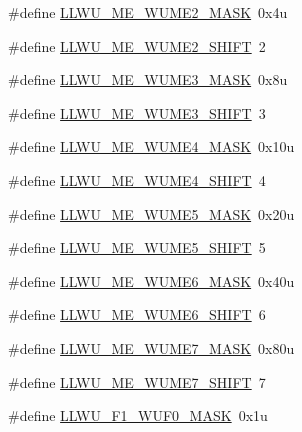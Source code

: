 \begin{DoxyCompactItemize}
\item 
\#define \hyperlink{group___l_l_w_u___register___masks_ga9f19f501dd2ad4aa2f7b01ac8edf8056}{L\+L\+W\+U\+\_\+\+M\+E\+\_\+\+W\+U\+M\+E2\+\_\+\+M\+A\+SK}~0x4u
\item 
\#define \hyperlink{group___l_l_w_u___register___masks_ga383c567df0dbc9edf2773d29676a7b30}{L\+L\+W\+U\+\_\+\+M\+E\+\_\+\+W\+U\+M\+E2\+\_\+\+S\+H\+I\+FT}~2
\item 
\#define \hyperlink{group___l_l_w_u___register___masks_ga6f6ea286130568de4df073a50fbdc282}{L\+L\+W\+U\+\_\+\+M\+E\+\_\+\+W\+U\+M\+E3\+\_\+\+M\+A\+SK}~0x8u
\item 
\#define \hyperlink{group___l_l_w_u___register___masks_ga394f6049d44881fafbc58b62e3ea8f44}{L\+L\+W\+U\+\_\+\+M\+E\+\_\+\+W\+U\+M\+E3\+\_\+\+S\+H\+I\+FT}~3
\item 
\#define \hyperlink{group___l_l_w_u___register___masks_ga4b7fa4566d64069e93d5bf9bf69efcf4}{L\+L\+W\+U\+\_\+\+M\+E\+\_\+\+W\+U\+M\+E4\+\_\+\+M\+A\+SK}~0x10u
\item 
\#define \hyperlink{group___l_l_w_u___register___masks_gad162d87bd892f7bfcd34c74941168e64}{L\+L\+W\+U\+\_\+\+M\+E\+\_\+\+W\+U\+M\+E4\+\_\+\+S\+H\+I\+FT}~4
\item 
\#define \hyperlink{group___l_l_w_u___register___masks_gadeab309cd88e84e94433398ea4656511}{L\+L\+W\+U\+\_\+\+M\+E\+\_\+\+W\+U\+M\+E5\+\_\+\+M\+A\+SK}~0x20u
\item 
\#define \hyperlink{group___l_l_w_u___register___masks_ga8eb531aa288bc7d32d75950b7bf9b1a5}{L\+L\+W\+U\+\_\+\+M\+E\+\_\+\+W\+U\+M\+E5\+\_\+\+S\+H\+I\+FT}~5
\item 
\#define \hyperlink{group___l_l_w_u___register___masks_ga4f4902c05f5e93174a1ef5afaa426d01}{L\+L\+W\+U\+\_\+\+M\+E\+\_\+\+W\+U\+M\+E6\+\_\+\+M\+A\+SK}~0x40u
\item 
\#define \hyperlink{group___l_l_w_u___register___masks_gaba71957dbca47b2dd3aaec44106b013e}{L\+L\+W\+U\+\_\+\+M\+E\+\_\+\+W\+U\+M\+E6\+\_\+\+S\+H\+I\+FT}~6
\item 
\#define \hyperlink{group___l_l_w_u___register___masks_ga455f995ef197eea9796910ff1b7327a0}{L\+L\+W\+U\+\_\+\+M\+E\+\_\+\+W\+U\+M\+E7\+\_\+\+M\+A\+SK}~0x80u
\item 
\#define \hyperlink{group___l_l_w_u___register___masks_ga1676e95c4d2477005c4c37ee97b45db3}{L\+L\+W\+U\+\_\+\+M\+E\+\_\+\+W\+U\+M\+E7\+\_\+\+S\+H\+I\+FT}~7
\item 
\#define \hyperlink{group___l_l_w_u___register___masks_ga1308a2e0d967a81b7fc32af6816cb532}{L\+L\+W\+U\+\_\+\+F1\+\_\+\+W\+U\+F0\+\_\+\+M\+A\+SK}~0x1u

\end{DoxyCompactItemize}
